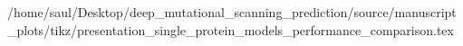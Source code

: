 /home/saul/Desktop/deep_mutational_scanning_prediction/source/manuscript_plots/tikz/presentation_single_protein_models_performance_comparison.tex